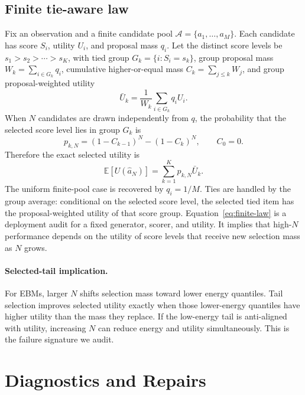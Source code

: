 \documentclass{article}
\newcommand{\utility}{U}
\newcommand{\candidates}{\mathcal{A}}
\begin{document}
\subsection{Finite tie-aware law}

Fix an observation and a finite candidate pool \(\candidates=\{a_1,\ldots,a_M\}\). Each candidate has score \(S_i\), utility \(U_i\), and proposal mass \(q_i\). Let the distinct score levels be \(s_1 > s_2 > \cdots > s_K\), with tied group \(G_k=\{i:S_i=s_k\}\), group proposal mass \(W_k=\sum_{i\in G_k}q_i\), cumulative higher-or-equal mass \(C_k=\sum_{j\le k}W_j\), and group proposal-weighted utility
\begin{equation}
    \bar U_k = \frac{1}{W_k}\sum_{i\in G_k} q_i U_i .
\end{equation}
When \(N\) candidates are drawn independently from \(q\), the probability that the selected score level lies in group \(G_k\) is
\begin{equation}
    p_{k,N} = (1-C_{k-1})^N - (1-C_k)^N,
    \qquad C_0=0 .
\end{equation}
Therefore the exact selected utility is
\begin{equation}
    \mathbb{E}[\utility(\hat a_N)] =
    \sum_{k=1}^{K} p_{k,N} \bar U_k .
    \label{eq:finite-law}
\end{equation}
The uniform finite-pool case is recovered by \(q_i=1/M\). Ties are handled by the group average: conditional on the selected score level, the selected tied item has the proposal-weighted utility of that score group. Equation~\ref{eq:finite-law} is a deployment audit for a fixed generator, scorer, and utility. It implies that high-\(N\) performance depends on the utility of score levels that receive new selection mass as \(N\) grows.

\paragraph{Selected-tail implication.}
For EBMs, larger \(N\) shifts selection mass toward lower energy quantiles. Tail selection improves selected utility exactly when those lower-energy quantiles have higher utility than the mass they replace. If the low-energy tail is anti-aligned with utility, increasing \(N\) can reduce energy and utility simultaneously. This is the failure signature we audit.

\section{Diagnostics and Repairs}
\end{document}
